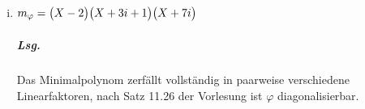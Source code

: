 \documentclass{scrreprt}
\begin{document}
\begin{enumerate}[(a)]
\begin{enumerate}[(i)]
\newpage
  \item $m_{\varphi} = \qty\big(X - 2)\qty\big(X + 3i + 1)\qty\big(X + 7i)$
    \subparagraph{Lsg.} Das Minimalpolynom zerfällt vollständig in paarweise
    verschiedene Linearfaktoren, nach Satz 11.26 der Vorlesung ist
    $\varphi$ diagonalisierbar.
  \end{enumerate}
\end{enumerate}
\end{document}
